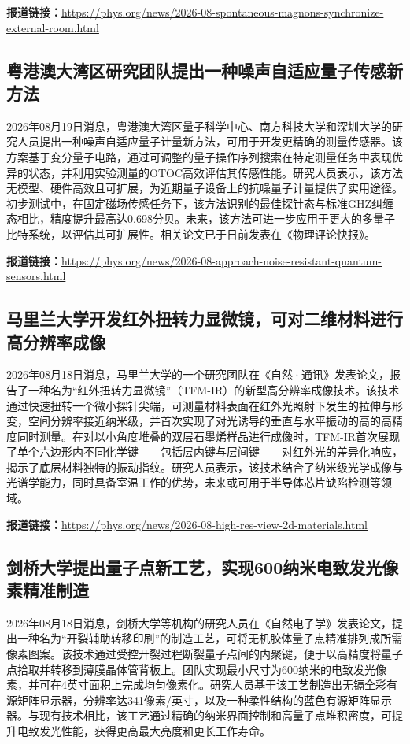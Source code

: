 \documentclass[12pt,a4paper]{ctexart}
\begin{document}
\noindent\textbf{报道链接：}\url{https://phys.org/news/2026-08-spontaneous-magnons-synchronize-external-room.html}

\subsection{ 粤港澳大湾区研究团队提出一种噪声自适应量子传感新方法 }

2026年08月19日消息，粤港澳大湾区量子科学中心、南方科技大学和深圳大学的研究人员提出一种噪声自适应量子计量新方法，可用于开发更精确的测量传感器。该方案基于变分量子电路，通过可调整的量子操作序列搜索在特定测量任务中表现优异的状态，并利用实验测量的OTOC高效评估其传感性能。研究人员表示，该方法无模型、硬件高效且可扩展，为近期量子设备上的抗噪量子计量提供了实用途径。初步测试中，在固定磁场传感任务下，该方法识别的最佳探针态与标准GHZ纠缠态相比，精度提升最高达0.698分贝。未来，该方法可进一步应用于更大的多量子比特系统，以评估其可扩展性。相关论文已于日前发表在《物理评论快报》。

\noindent\textbf{报道链接：}\url{https://phys.org/news/2026-08-approach-noise-resistant-quantum-sensors.html}

\subsection{ 马里兰大学开发红外扭转力显微镜，可对二维材料进行高分辨率成像 }

2026年08月18日消息，马里兰大学的一个研究团队在《自然·通讯》发表论文，报告了一种名为“红外扭转力显微镜”（TFM-IR）的新型高分辨率成像技术。该技术通过快速扭转一个微小探针尖端，可测量材料表面在红外光照射下发生的拉伸与形变，空间分辨率接近纳米级，并首次实现了对光诱导的垂直与水平振动的高的高精度同时测量。在对以小角度堆叠的双层石墨烯样品进行成像时，TFM-IR首次展现了单个六边形内不同化学键——包括层内键与层间键——对红外光的差异化响应，揭示了底层材料独特的振动指纹。研究人员表示，该技术结合了纳米级光学成像与光谱学能力，同时具备室温工作的优势，未来或可用于半导体芯片缺陷检测等领域。

\noindent\textbf{报道链接：}\url{https://phys.org/news/2026-08-high-res-view-2d-materials.html}

\subsection{ 剑桥大学提出量子点新工艺，实现600纳米电致发光像素精准制造 }

2026年08月18日消息，剑桥大学等机构的研究人员在《自然电子学》发表论文，提出一种名为“开裂辅助转移印刷”的制造工艺，可将无机胶体量子点精准排列成所需像素图案。该技术通过受控开裂过程断裂量子点间的内聚键，便于以高精度将量子点拾取并转移到薄膜晶体管背板上。团队实现最小尺寸为600纳米的电致发光像素，并可在4英寸面积上完成均匀像素化。研究人员基于该工艺制造出无镉全彩有源矩阵显示器，分辨率达341像素/英寸，以及一种柔性结构的蓝色有源矩阵显示器。与现有技术相比，该工艺通过精确的纳米界面控制和高量子点堆积密度，可提升电致发光性能，获得更高最大亮度和更长工作寿命。
\end{document}
